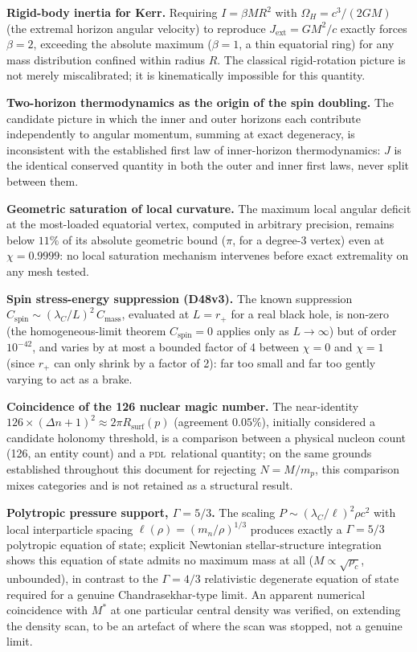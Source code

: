 \documentclass[12pt,a4paper]{article}
\newcommand{\PDL}{\textsc{pdl}}
\newcommand{\Rsurf}{R_{\mathrm{surf}}}
\newcommand{\chif}{\chi}
\newcommand{\lamC}{\lambda_C}
\begin{document}
\begin{negativebox}
\textbf{Rigid-body inertia for Kerr.} Requiring $I=\beta MR^2$ with
$\Omega_H=c^3/(2GM)$ (the extremal horizon angular velocity) to
reproduce $J_{\mathrm{ext}}=GM^2/c$ exactly forces $\beta=2$,
exceeding the absolute maximum ($\beta=1$, a thin equatorial ring)
for any mass distribution confined within radius $R$. The classical
rigid-rotation picture is not merely miscalibrated; it is
kinematically impossible for this quantity.

\textbf{Two-horizon thermodynamics as the origin of the spin
doubling.} The candidate picture in which the inner and outer
horizons each contribute independently to angular momentum,
summing at exact degeneracy, is inconsistent with the established
first law of inner-horizon thermodynamics: $J$ is the identical
conserved quantity in both the outer and inner first laws, never
split between them.

\textbf{Geometric saturation of local curvature.} The maximum local
angular deficit at the most-loaded equatorial vertex, computed in
arbitrary precision, remains below $11\%$ of its absolute geometric
bound ($\pi$, for a degree-3 vertex) even at $\chif=0.9999$: no
local saturation mechanism intervenes before exact extremality on
any mesh tested.

\textbf{Spin stress-energy suppression (D48v3).} The known
suppression $C_{\mathrm{spin}}\sim(\lamC/L)^2\,C_{\mathrm{mass}}$,
evaluated at $L=r_+$ for a real black hole, is non-zero (the
homogeneous-limit theorem $C_{\mathrm{spin}}=0$ applies only as
$L\to\infty$) but of order $10^{-42}$, and varies by at most a
bounded factor of 4 between $\chif=0$ and $\chif=1$ (since $r_+$ can
only shrink by a factor of 2): far too small and far too gently
varying to act as a brake.

\textbf{Coincidence of the 126 nuclear magic number.} The
near-identity $126\times(\Delta n+1)^2\approx2\pi\Rsurf(p)$
(agreement $0.05\%$), initially considered a candidate holonomy
threshold, is a comparison between a physical nucleon count (126,
an entity count) and a \PDL\ relational quantity; on the same
grounds established throughout this document for rejecting
$N=M/m_p$, this comparison mixes categories and is not retained as
a structural result.

\textbf{Polytropic pressure support, $\Gamma=5/3$.} The scaling
$P\sim(\lamC/\ell)^2\rho c^2$ with local interparticle spacing
$\ell(\rho)=(m_n/\rho)^{1/3}$ produces exactly a $\Gamma=5/3$
polytropic equation of state; explicit Newtonian stellar-structure
integration shows this equation of state admits no maximum mass at
all ($M\propto\sqrt{\rho_c}$, unbounded), in contrast to the
$\Gamma=4/3$ relativistic degenerate equation of state required for
a genuine Chandrasekhar-type limit. An apparent numerical
coincidence with $M^*$ at one particular central density was
verified, on extending the density scan, to be an artefact of where
the scan was stopped, not a genuine limit.


\end{negativebox}
\end{document}
